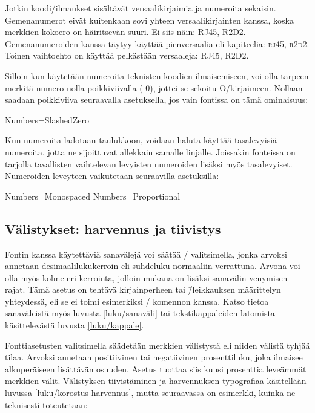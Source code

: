 \noindent
Jotkin koodi\-/ilmaukset sisältävät versaalikirjaimia ja numeroita
sekaisin. Gemenanumerot eivät kuitenkaan sovi yhteen versaalikirjainten
kanssa, koska merkkien kokoero on häiritsevän suuri. Ei siis näin:
RJ45, R2D2. Gemenanumeroiden kanssa täytyy käyttää pienversaalia eli
kapiteelia: \textsc{rj45}, \textsc{r2d2}. Toinen vaihtoehto on käyttää
pelkästään versaaleja: {\versaalinum RJ45, R2D2}.

Silloin kun käytetään numeroita teknisten koodien ilmaisemiseen, voi
olla tarpeen merkitä numero nolla poikkiviivalla
({ 0}), jottei se
sekoitu O\=/kirjaimeen. Nollaan saadaan poikkiviiva seuraavalla
asetuksella, jos vain fontissa on tämä ominaisuus:

\begin{koodilohkosis}
Numbers=SlashedZero
\end{koodilohkosis}

\noindent
Kun numeroita ladotaan taulukkoon, voidaan haluta käyttää tasalevyisiä
numeroita, jotta ne sijoittuvat allekkain samalle linjalle. Joissakin
fonteissa on tarjolla tavallisten vaihtelevan levyisten numeroiden
lisäksi myös tasalevyiset. Numeroiden leveyteen vaikutetaan seuraavilla
asetuksilla:

\begin{koodilohkosis}
Numbers=Monospaced   %
Numbers=Proportional %
\end{koodilohkosis}

\subsection{Välistykset: harvennus ja tiivistys}
\label{luku/fontit-välistys}

Fontin kanssa käytettäviä sanavälejä voi säätää \-/
valitsimella, jonka arvoksi annetaan desimaalilukukerroin eli suhdeluku
normaaliin verrattuna. Arvona voi olla myös kolme eri kerrointa, jolloin
mukana on lisäksi sanavälin venymisen rajat. Tämä asetus on tehtävä
kirjainperheen tai \=/leikkauksen määrittelyn yhteydessä, eli se ei
toimi esimerkiksi \-/ komennon kanssa. Katso
tietoa sanaväleistä myös luvusta \ref{luku/sanaväli} tai
tekstikappaleiden latomista käsittelevästä luvusta \ref{luku/kappale}.
\noclub[2]

Fonttiasetusten valitsimella  säädetään merkkien
välistystä eli niiden välistä tyhjää tilaa. Arvoksi annetaan
positiivinen tai negatiivinen prosenttiluku, joka ilmaisee alkuperäiseen
lisättävän osuuden. Asetus  tuottaa siis
kuusi prosenttia leveämmät merkkien välit. Välistyksen tiivistäminen ja
harvennuksen typografiaa käsitellään luvussa
\ref{luku/korostus-harvennus}, mutta seuraavassa on esimerkki, kuinka ne
teknisesti toteutetaan:

